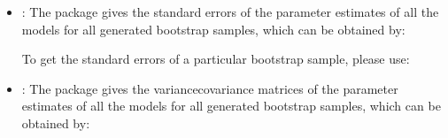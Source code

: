 \documentclass[letterpaper,10pt,english]{sphinxmanual}
\begin{document}
\begin{itemize}
\item {} 
\sphinxAtStartPar
{}: The package gives the standard errors of the parameter estimates of all the models for all generated
bootstrap samples, which can be obtained by:
\begin{quote}

\begin{sphinxVerbatim}[commandchars=\\\{\}]
            
  \PYG{p}{[}\PYG{p}{]}
\end{sphinxVerbatim}
\end{quote}

\sphinxAtStartPar
To get the standard errors of a particular bootstrap sample, please use:
\begin{quote}

\begin{sphinxVerbatim}[commandchars=\\\{\}]
\PYG{p}{[}\PYG{p}{]}\PYG{p}{[}\PYG{p}{]}
\end{sphinxVerbatim}
\end{quote}

\item {} 
\sphinxAtStartPar
{}: The package gives the variance\sphinxhyphen{}covariance matrices of the parameter estimates of all the models for all generated
bootstrap samples, which can be obtained by:
\begin{quote}


\end{quote}
\end{itemize}
\end{document}
